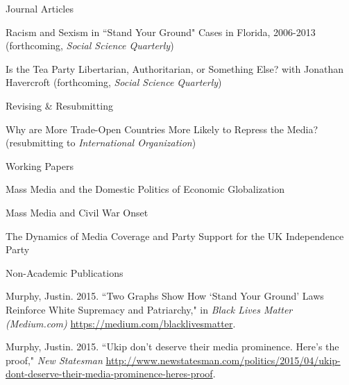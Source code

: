 \documentclass{resume} %
\begin{document}
\begin{rSection}{Journal Articles}

\begin{rSubsection}{}{}{}{}
\item Racism and Sexism in ``Stand Your Ground" Cases in Florida, 2006-2013 (forthcoming, \emph{Social Science Quarterly}) \vspace{.5em}
\item Is the Tea Party Libertarian, Authoritarian, or Something Else? with Jonathan Havercroft (forthcoming, \emph{Social Science Quarterly})
\end{rSubsection}

\begin{rSubsection}{Revising \& Resubmitting}{}{}{}
\item Why are More Trade-Open Countries More Likely to Repress the Media? (resubmitting to \emph{International Organization})
\end{rSubsection}


\begin{rSubsection}{Working Papers}{}{}{}
\item Mass Media and the Domestic Politics of Economic Globalization
\item Mass Media and Civil War Onset
\item The Dynamics of Media Coverage and Party Support for the UK Independence Party
\end{rSubsection}

\end{rSection}


\begin{rSection}{Non-Academic Publications}

\raggedright

\item Murphy, Justin. 2015. ``Two Graphs Show How `Stand Your Ground' Laws Reinforce White Supremacy and Patriarchy," in \emph{Black Lives Matter (Medium.com)} \url{https://medium.com/blacklivesmatter}. 
\item Murphy, Justin. 2015. ``Ukip don't deserve their media prominence. Here's the proof," \emph{New Statesman} \url{http://www.newstatesman.com/politics/2015/04/ukip-dont-deserve-their-media-prominence-heres-proof}.

\end{rSection}
\end{document}
